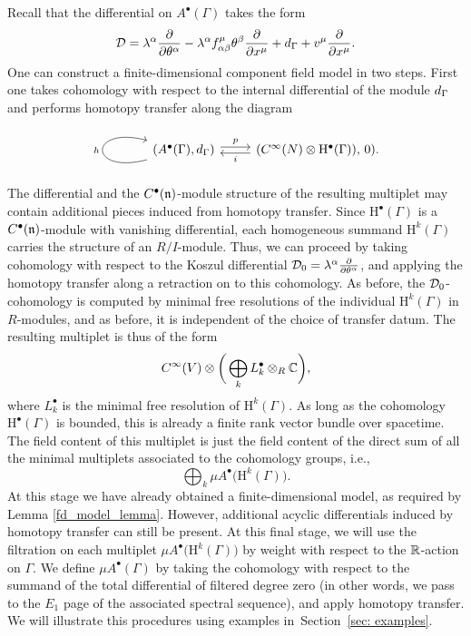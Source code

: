 \documentclass[11pt]{article}
\numberwithin{equation}{section}
\numberwithin{equation}{section}
\def\bu{\bullet}
\def\d{{\rm d}}
\begin{document}
Recall that the differential on $A^\bullet(\Gamma)$ takes the form
\begin{equation*}
\cD = \lambda^\alpha \frac{\partial}{\partial \theta^\alpha} - \lambda^\alpha f^\mu_{\alpha \beta} \theta^\beta \frac{\partial}{\partial x^\mu} + \d_\Gamma + v^\mu
\frac{\partial}{\partial x^\mu} .
\end{equation*}
One can construct a finite-dimensional component field model in two steps. First one takes cohomology with respect to the internal differential of the module $\d_\Gamma$ and performs homotopy transfer along the diagram
\begin{equation*}
\begin{tikzcd}
\arrow[loop left]{l}{h}(A^\bullet (\Gamma) , \d_\Gamma)\arrow[r, shift left, "p"] &(C^\infty(N) \otimes \mathrm H^\bullet(\Gamma) ) , \, 0)\arrow[l, shift left, "i"] .
\end{tikzcd}
\end{equation*}
The differential and the $C^\bullet(\mathfrak n)$-module structure of the resulting multiplet may contain additional pieces induced from homotopy transfer. Since $\mathrm H^\bullet(\Gamma)$ is a $C^\bullet(\mathfrak n)$-module with vanishing differential, each homogeneous summand $\mathrm H^k(\Gamma)$ carries the structure of an $R/I$-module. Thus, we can proceed by taking cohomology with respect to the Koszul differential $\mathcal D_0 = \lambda^\alpha \frac{\partial}{\partial \theta^\alpha}$, and applying the homotopy transfer along a retraction on to this cohomology. As before, the $\mathcal D_0$-cohomology is computed by minimal free resolutions of the individual $\mathrm H^k(\Gamma)$ in $R$-modules, and as before, it is independent of the choice of transfer datum. The resulting multiplet is thus of the form
\begin{equation*}
C^\infty(V) \otimes \bigg(\bigoplus_k L^\bullet_k \otimes_R \mathbb C\bigg) ,
\end{equation*}
where $L^\bullet_k$ is the minimal free resolution of $\mathrm H^k(\Gamma)$. As long as the cohomology $\mathrm H^\bullet(\Gamma)$ is bounded, this is already a finite rank vector bundle over spacetime. The field content of this multiplet is just the field content of the direct sum of all the minimal multiplets associated to the cohomology groups, i.e.,
\begin{equation*}
\bigoplus_k \mu A^\bu\big(\mathrm H^k(\Gamma)\big) .
\end{equation*}
At this stage we have already obtained a finite-dimensional model, as required by Lemma \ref{fd_model_lemma}. However, additional acyclic differentials induced by homotopy transfer can still be present. At this final stage, we will use the filtration on each multiplet $\mu A^\bu\big(\mathrm H^k(\Gamma)\big)$ by weight with respect to the $\mathbb R$-action on $\Gamma$. We define $\mu A^\bullet(\Gamma)$ by taking the cohomology with respect to the summand of the total differential of filtered degree zero (in other words, we pass to the $E_1$ page of the associated spectral sequence), and apply homotopy transfer. We will illustrate this procedures using examples in~Section~\ref{sec: examples}.
\end{document}
